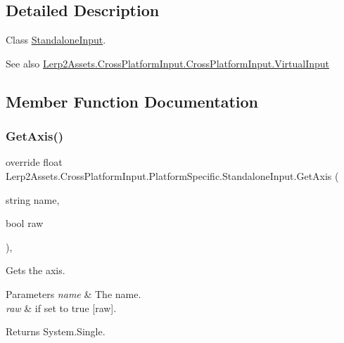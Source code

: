 \subsection{Detailed Description}
Class \hyperlink{class_lerp2_assets_1_1_cross_platform_input_1_1_platform_specific_1_1_standalone_input}{Standalone\+Input}. 

\begin{DoxySeeAlso}{See also}
\hyperlink{class_lerp2_assets_1_1_cross_platform_input_1_1_cross_platform_input_1_1_virtual_input}{Lerp2\+Assets.\+Cross\+Platform\+Input.\+Cross\+Platform\+Input.\+Virtual\+Input}


\end{DoxySeeAlso}


\subsection{Member Function Documentation}
\mbox{\label{class_lerp2_assets_1_1_cross_platform_input_1_1_platform_specific_1_1_standalone_input_aee3650ff35b358d61f859bbeb3111e52}} 
\subsubsection{\texorpdfstring{Get\+Axis()}{GetAxis()}}
{\footnotesize\ttfamily override float Lerp2\+Assets.\+Cross\+Platform\+Input.\+Platform\+Specific.\+Standalone\+Input.\+Get\+Axis (\begin{DoxyParamCaption}\item[{string}]{name,  }\item[{bool}]{raw }\end{DoxyParamCaption})\hspace{0.3cm}{\ttfamily [inline]}, {\ttfamily [virtual]}}



Gets the axis. 


\begin{DoxyParams}{Parameters}
{\em name} & The name.\\
\hline
{\em raw} & if set to {\ttfamily true} \mbox{[}raw\mbox{]}.\\
\hline
\end{DoxyParams}
\begin{DoxyReturn}{Returns}
System.\+Single.
\end{DoxyReturn}


